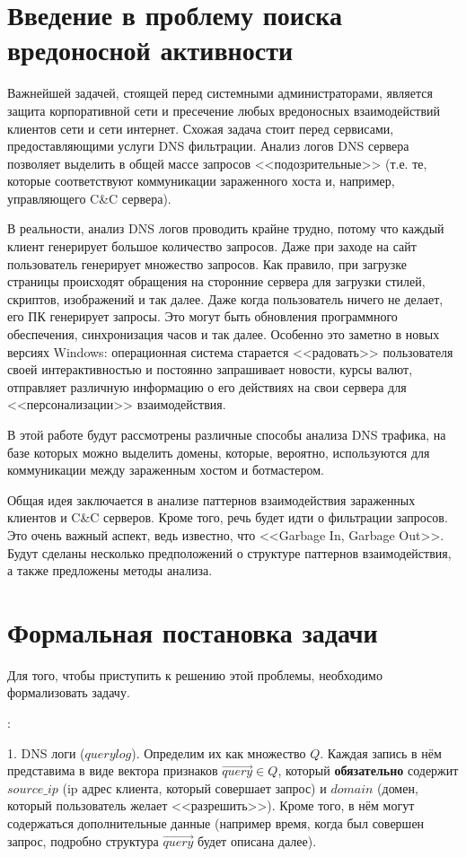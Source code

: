\documentclass[14pt]{extreport}
\begin{document}
\newpage
    \chapter{Введение в проблему поиска вредоносной активности}

Важнейшей задачей, стоящей перед системными администраторами, является защита корпоративной сети и пресечение любых вредоносных взаимодействий клиентов сети и сети интернет. Схожая задача стоит перед сервисами, предоставляющими услуги DNS фильтрации. Анализ логов DNS сервера позволяет выделить в общей массе запросов <<подозрительные>> (т.е. те, которые соответствуют коммуникации зараженного хоста и, например, управляющего C\&C сервера). 

В реальности, анализ DNS логов проводить крайне трудно, потому что каждый клиент генерирует большое количество запросов. Даже при заходе на сайт пользователь генерирует множество запросов. Как правило, при загрузке страницы происходят обращения на сторонние сервера для загрузки стилей, скриптов, изображений и так далее. Даже когда пользователь ничего не делает, его ПК генерирует запросы. Это могут быть обновления программного обеспечения, синхронизация часов и так далее. Особенно это заметно в новых версиях Windows: операционная система старается <<радовать>> пользователя своей интерактивностью и постоянно запрашивает новости, курсы валют, отправляет различную информацию о его действиях на свои сервера для <<персонализации>> взаимодействия.

В этой работе будут рассмотрены различные способы анализа DNS трафика, на базе которых можно выделить домены, которые, вероятно, используются для коммуникации между зараженным хостом и ботмастером.

\newpage
Общая идея заключается в анализе паттернов взаимодействия зараженных клиентов и C\&C серверов. Кроме того, речь будет идти о фильтрации запросов. Это очень важный аспект, ведь известно, что <<Garbage In, Garbage Out>>. Будут сделаны несколько предположений о структуре паттернов взаимодействия, а также предложены методы анализа.

\chapter{Формальная постановка задачи}
	Для того, чтобы приступить к решению этой проблемы, необходимо формализовать задачу.
	
	{:}
		
		1. DNS логи ($querylog$). Определим их как множество $Q$. Каждая запись в нём представима в виде вектора признаков $\vec{query}$$\in$$Q$, который \textbf{обязательно} содержит $source\_ip$ (ip адрес клиента, который совершает запрос) и $domain$ (домен, который пользователь желает <<разрешить>>). Кроме того, в нём могут содержаться дополнительные данные (например время, когда был совершен запрос, подробно структура $\vec{query}$ будет описана далее).
		
\end{document}
